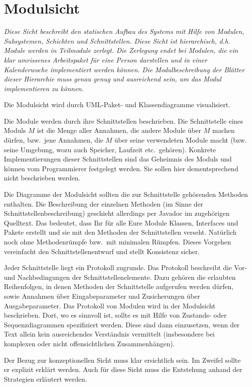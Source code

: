 \documentclass[fontsize=12pt,paper=a4,twoside]{scrartcl}
\begin{document}
\section{Modulsicht}
\label{sec:modulsicht}

{\it
Diese Sicht beschreibt den statischen Aufbau des Systems mit Hilfe von
Modulen, Subsystemen, Schichten und Schnittstellen. 
Diese Sicht ist hierarchisch, d.h. Module werden in Teilmodule
zerlegt. Die Zerlegung endet bei Modulen, die ein klar umrissenes
Arbeitspaket für eine Person darstellen und in einer Kalenderwoche
implementiert werden können. Die Modulbeschreibung der Blätter dieser
Hierarchie muss genau genug und ausreichend sein, um das Modul 
implementieren zu können.

Die Modulsicht wird durch {UML}-Paket- und Klassendiagramme visualisiert.

Die Module werden durch ihre Schnittstellen beschrieben. 
Die Schnittstelle eines Moduls $M$ ist die Menge aller Annahmen, die
andere Module über $M$ machen dürfen, bzw.\ jene Annahmen, die $M$
über seine verwendeten Module macht (bzw. seine Umgebung, wozu auch
Speicher, Laufzeit etc.\ gehören).
Konkrete Implementierungen dieser Schnittstellen sind das Geheimnis des Moduls
und können vom Programmierer festgelegt werden. Sie sollen hier
dementsprechend nicht beschrieben werden. 

Die Diagramme der Modulsicht sollten die zur Schnittstelle gehörenden Methoden
enthalten. Die Beschreibung der einzelnen Methoden (im Sinne der Schnittstellenbeschreibung)
geschieht allerdings per Javadoc im zugehörigen Quelltext. Das bedeutet, dass Ihr
für alle Eure Module Klassen, Interfaces und Pakete erstellt und sie mit den Methoden der
Schnittstellen verseht. Natürlich noch ohne Methodenrümpfe bzw.\ mit minimalen Rümpfen.
Dieses Vorgehen vereinfacht den Schnittstellenentwurf und stellt Konsistenz sicher.

Jeder Schnittstelle liegt ein
Protokoll zugrunde. Das Protokoll beschreibt die Vor- und
Nachbedingungen der Schnittstellenelemente. Dazu gehören die erlaubten
Reihenfolgen, in denen Methoden der Schnittstelle aufgerufen werden
dürfen, sowie Annahmen über Eingabeparameter und Zusicherungen über
Ausgabeparameter. Das Protokoll von Modulen wird in der Modulsicht beschrieben.
Dort, wo es sinnvoll ist, sollte es mit Hilfe von Zustands- oder
Sequenzdiagrammen spezifiziert werden. Diese sind dann einzusetzen, wenn der
Text allein kein ausreichendes Verständnis vermittelt (insbesondere
bei komplexen oder nicht offensichtlichen Zusammenhängen).

Der Bezug zur konzeptionellen Sicht muss klar ersichtlich sein. Im
Zweifel sollte er explizit erklärt werden. Auch für diese Sicht muss
die Entstehung anhand der Strategien erläutert werden.
}
\end{document}
